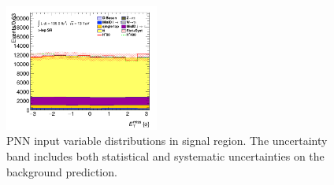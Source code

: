 \begin{figure}[!htp]
\begin{center}
			\includegraphics[width=0.45\textwidth]{chapters/chapter6_HPlus/images/taulep/met_phi_SR_TAULEP.png} 
			\end{center}
			\caption{
			PNN input variable distributions in \taulep signal region. The uncertainty band includes both statistical and systematic uncertainties on the background prediction. 
			}
			\label{fig:sr-taulep-1}
		\end{figure}

